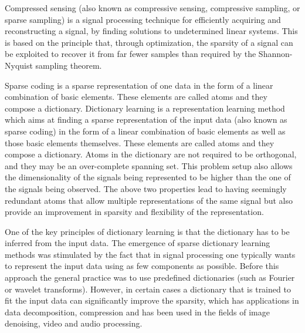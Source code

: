 Compressed sensing (also known as compressive sensing, compressive sampling, or sparse sampling) is a signal processing technique for efficiently acquiring and reconstructing a signal, by finding solutions to undetermined linear systems. This is based on the principle that, through optimization, the sparsity of a signal can be exploited to recover it from far fewer samples than required by the Shannon-Nyquist sampling theorem. 


Sparse coding is a sparse representation of one data in the form of a linear combination of basic elements. These elements are called atoms and they compose a dictionary. Dictionary learning is a representation learning method which aims at finding a sparse representation of the input data (also known as sparse coding) in the form of a linear combination of basic elements as well as those basic elements themselves. These elements are called atoms and they compose a dictionary. Atoms in the dictionary are not required to be orthogonal, and they may be an over-complete spanning set. This problem setup also allows the dimensionality of the signals being represented to be higher than the one of the signals being observed. The above two properties lead to having seemingly redundant atoms that allow multiple representations of the same signal but also provide an improvement in sparsity and flexibility of the representation.

One of the key principles of dictionary learning is that the dictionary has to be inferred from the input data. The emergence of sparse dictionary learning methods was stimulated by the fact that in signal processing one typically wants to represent the input data using as few components as possible. Before this approach the general practice was to use predefined dictionaries (such as Fourier or wavelet transforms). However, in certain cases a dictionary that is trained to fit the input data can significantly improve the sparsity, which has applications in data decomposition, compression and has been used in the fields of image denoising, video and audio processing.

